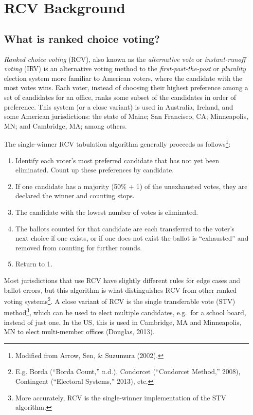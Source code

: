 \documentclass[12pt,twoside]{reedthesis}
\begin{document}
\hypertarget{demo-litreview}{%
\chapter{RCV Background}\label{demo-litreview}}

\hypertarget{what-is-ranked-choice-voting}{%
\section{What is ranked choice voting?}\label{what-is-ranked-choice-voting}}

\emph{Ranked choice voting} (RCV), also known as the \emph{alternative vote} or \emph{instant-runoff voting} (IRV) is an alternative voting method to the \emph{first-past-the-post} or \emph{plurality} election system more familiar to American voters, where the candidate with the most votes wins. Each voter, instead of choosing their highest preference among a set of candidates for an office, ranks some subset of the candidates in order of preference. This system (or a close variant) is used in Australia, Ireland, and some American jurisdictions: the state of Maine; San Francisco, CA; Minneapolis, MN; and Cambridge, MA; among others.

The single-winner RCV tabulation algorithm generally proceeds as follows\footnote{Modified from Arrow, Sen, \& Suzumura (2002).}:
\begin{enumerate}
\def\labelenumi{\arabic{enumi}.}
\item
  Identify each voter's most preferred candidate that has not yet been eliminated. Count up these preferences by candidate.
\item
  If one candidate has a majority (50\% + 1) of the unexhausted votes, they are declared the winner and counting stops.
\item
  The candidate with the lowest number of votes is eliminated.
\item
  The ballots counted for that candidate are each transferred to the voter's next choice if one exists, or if one does not exist the ballot is ``exhausted'' and removed from counting for further rounds.
\item
  Return to 1.
\end{enumerate}
Most jurisdictions that use RCV have slightly different rules for edge cases and ballot errors, but this algorithm is what distinguishes RCV from other ranked voting systems\footnote{E.g. Borda (``Borda Count,'' n.d.), Condorcet (``Condorcet Method,'' 2008), Contingent (``Electoral Systems,'' 2013), etc.}. A close variant of RCV is the single transferable vote (STV) method\footnote{More accurately, RCV is the single-winner implementation of the STV algorithm.}, which can be used to elect multiple candidates, e.g.~for a school board, instead of just one. In the US, this is used in Cambridge, MA and Minneapolis, MN to elect multi-member offices (Douglas, 2013).
\end{document}
